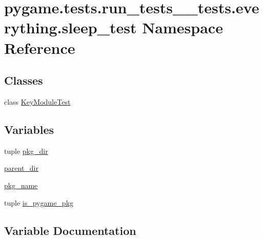 \hypertarget{namespacepygame_1_1tests_1_1run__tests____tests_1_1everything_1_1sleep__test}{}\section{pygame.\+tests.\+run\+\_\+tests\+\_\+\+\_\+tests.\+everything.\+sleep\+\_\+test Namespace Reference}
\label{namespacepygame_1_1tests_1_1run__tests____tests_1_1everything_1_1sleep__test}
\subsection*{Classes}
\begin{DoxyCompactItemize}
\item 
class \hyperlink{classpygame_1_1tests_1_1run__tests____tests_1_1everything_1_1sleep__test_1_1_key_module_test}{Key\+Module\+Test}
\end{DoxyCompactItemize}
\subsection*{Variables}
\begin{DoxyCompactItemize}
\item 
tuple \hyperlink{namespacepygame_1_1tests_1_1run__tests____tests_1_1everything_1_1sleep__test_a020b60420e99f5a6087f655b85302930}{pkg\+\_\+dir}
\item 
\hyperlink{namespacepygame_1_1tests_1_1run__tests____tests_1_1everything_1_1sleep__test_a7d3511e29809de06b462b43e2258791d}{parent\+\_\+dir}
\item 
\hyperlink{namespacepygame_1_1tests_1_1run__tests____tests_1_1everything_1_1sleep__test_a7384a829597e64a21949cc24e0a2a6e9}{pkg\+\_\+name}
\item 
tuple \hyperlink{namespacepygame_1_1tests_1_1run__tests____tests_1_1everything_1_1sleep__test_a1be6024b6282d6c6920ac8e387750fd8}{is\+\_\+pygame\+\_\+pkg}
\end{DoxyCompactItemize}


\subsection{Variable Documentation}
\mbox{\label{namespacepygame_1_1tests_1_1run__tests____tests_1_1everything_1_1sleep__test_a1be6024b6282d6c6920ac8e387750fd8}} 
